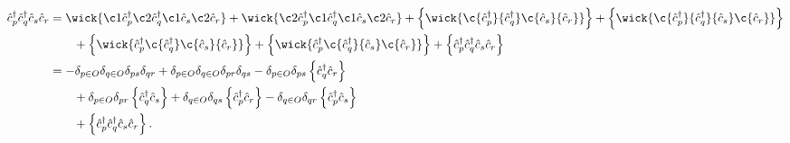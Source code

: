         \begin{align}
            \ccr{p}\ccr{q}\can{s}\can{r}
            &=
            \wick{
                \c1 {\ccr{p}}
                \c2 {\ccr{q}}
                \c1 {\can{s}}
                \c2 {\can{r}}
            }
            +
            \wick{
                \c2 {\ccr{p}}
                \c1 {\ccr{q}}
                \c1 {\can{s}}
                \c2 {\can{r}}
            }
            + \brac{
                \wick{
                    \c {\ccr{p}}
                    {\ccr{q}}
                    \c {\can{s}}
                    {\can{r}}
                }
            }
            + \brac{
                \wick{
                    \c {\ccr{p}}
                    {\ccr{q}}
                    {\can{s}}
                    \c {\can{r}}
                }
            }
            \nonumber \\
            &\qquad
            + \brac{
                \wick{
                    {\ccr{p}}
                    \c {\ccr{q}}
                    \c {\can{s}}
                    {\can{r}}
                }
            }
            + \brac{
                \wick{
                    {\ccr{p}}
                    \c {\ccr{q}}
                    {\can{s}}
                    \c {\can{r}}
                }
            }
            + \brac{
                {\ccr{p}}
                {\ccr{q}}
                {\can{s}}
                {\can{r}}
            }
            \\
            &=
            -\delta_{p \in O}
            \delta_{q \in O}
            \delta_{ps}
            \delta_{qr}
            + \delta_{p \in O}
            \delta_{q \in O}
            \delta_{pr}
            \delta_{qs}
            - \delta_{p \in O}
            \delta_{ps}
            \brac{
                \ccr{q}
                \can{r}
            }
            \nonumber \\
            &\qquad
            + \delta_{p \in O}
            \delta_{pr}
            \brac{
                \ccr{q}
                \can{s}
            }
            + \delta_{q \in O}
            \delta_{qs}
            \brac{
                \ccr{p}
                \can{r}
            }
            - \delta_{q \in O}
            \delta_{qr}
            \brac{
                \ccr{p}
                \can{s}
            }
            \nonumber \\
            &\qquad
            + \brac{
                {\ccr{p}}
                {\ccr{q}}
                {\can{s}}
                {\can{r}}
            }.
            \label{eq:two-hamil-op-wick}
        \end{align}
